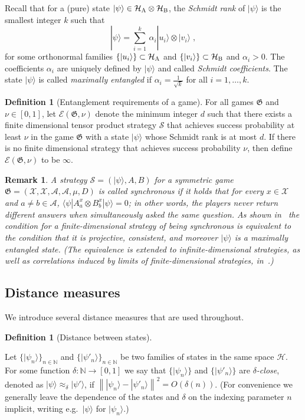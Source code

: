 \documentclass[11pt]{article}
\newtheorem{remark}[theorem]{Remark}
\theoremstyle{definition}
\newtheorem{definition}[theorem]{Definition}
\newcommand{\ket}[1]{|#1\rangle}
\newcommand{\bra}[1]{\langle#1|}
\newcommand{\N}{\ensuremath{\mathbb{N}}}
\newcommand{\mH}{\ensuremath{\mathcal{H}}}
\newcommand{\norm}[1]{\left\| {#1} \right\|}
\newcommand{\game}{\mathfrak{G}}
\newcommand{\strategy}{\mathscr{S}}
\newcommand{\labelstyle}[1]{\ensuremath{\textsc{#1}}\xspace}
\newcommand{\alice}{\labelstyle{A}}
\newcommand{\bob}{\labelstyle{B}}
\newcommand{\Ent}{\mathscr{E}}
\renewcommand{\cal}[1]{\mathcal{#1}}
\begin{document}
Recall that for a (pure) state $\ket{\psi}\in \mH_\alice \otimes \mH_\bob$, the \emph{Schmidt rank} of $\ket{\psi}$ is the smallest integer $k$ such that 
\[ \ket{\psi} = \sum_{i=1}^k\, \alpha_i \ket{u_i}\otimes \ket{v_i}\;,\]
for some orthonormal families $\{\ket{u_i}\}\subset \mH_\alice$ and $\{\ket{v_i}\}\subset\mH_\bob$ and $\alpha_i>0$. The coefficients $\alpha_i$ are uniquely defined by $\ket{\psi}$ and called \emph{Schmidt coefficients}. The state $\ket{\psi}$ is called \emph{maximally entangled} if $\alpha_i=\frac{1}{\sqrt{k}}$ for all $i=1,\ldots,k$.  


\begin{definition}[Entanglement requirements of a game]
  \label{def:ent}
	For all games $\game$ and $\nu \in [0, 1]$, let $\Ent(\game, \nu)$ denote the
  minimum integer $d$ such that there exists a finite dimensional tensor product
  strategy $\strategy$ that achieves success probability at least $\nu$ in the
  game $\game$ with a state $\ket{\psi}$ whose Schmidt rank is at most $d$.
  If there is no finite dimensional strategy that achieves success probability
  $\nu$, then define $\Ent(\game, \nu)$ to be $\infty$.
\end{definition}



\begin{remark}
  A strategy $\strategy = (\ket{\psi},A,B)$ for a symmetric game $\game =
  (\cal{X}, \cal{X}, \cal{A}, \cal{A}, \mu, D)$ is called \emph{synchronous} if
  it holds that for every $x\in \cal{X}$ and $a\neq b \in \cal{A}$, $\bra{\psi}
  A^x_a \otimes B^x_b \ket{\psi} = 0$; in other words,
  the players never return different answers when simultaneously asked the same
  question.
  As shown in~\cite{paulsen2016estimating} the condition for a
  finite-dimensional strategy of being synchronous is equivalent to the
  condition that it is projective, consistent, and moreover $\ket{\psi}$ is a
  maximally entangled state.
  (The equivalence is extended to infinite-dimensional strategies, as well as
  correlations induced by limits of finite-dimensional strategies,
  in~\cite{kim2018synchronous}.)
\end{remark}
\subsection{Distance measures}

We introduce several distance measures that are used throughout.

\begin{definition}[Distance between states]
  \label{def:state-distance}

	Let $\{\ket{\psi_n}\}_{n\in \N}$ and $\{\ket{\psi'_n}\}_{n\in \N}$ be two
  families of states in the same space $\mH$.
  For some function $\delta : \N \to [0,1]$ we say that $\{ \ket{\psi_n} \}$ and
  $\{ \ket{\psi'_n} \}$ are \emph{$\delta$-close}, denoted as $\ket{\psi}
  \approx_\delta \ket{\psi'}$, if $ \norm{\ket{\psi_n} - \ket{\psi'_n}}^2 =
  O(\delta(n))$.
  (For convenience we generally leave the dependence of the states and $\delta$
  on the indexing parameter $n$ implicit, writing e.g.\ $\ket{\psi}$ for $\ket{\psi_n}$.)
\end{definition}
\end{document}
